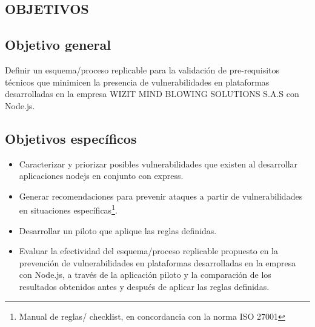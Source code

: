 \begin{center}
    \item  \section{OBJETIVOS}
\end{center}

\subsection{Objetivo general}

Definir un esquema/proceso replicable para la validación de pre-requisitos técnicos que minimicen la presencia de vulnerabilidades en plataformas desarrolladas en la empresa WIZIT MIND BLOWING SOLUTIONS S.A.S con Node.js.

\subsection{Objetivos específicos}
\begin{itemize}
    \item Caracterizar y priorizar posibles vulnerabilidades que existen al desarrollar aplicaciones nodejs en conjunto con express.
    \item Generar recomendaciones para prevenir ataques a partir de vulnerabilidades en situaciones específicas\footnote{Manual de reglas/ checklist, en concordancia con la norma ISO 27001}.
    \item Desarrollar un piloto que aplique las reglas definidas.
    \item Evaluar la efectividad del esquema/proceso replicable propuesto en la prevención de vulnerabilidades en plataformas desarrolladas en la empresa con Node.js, a través de la aplicación piloto y la comparación de los resultados obtenidos antes y después de aplicar las reglas definidas.
\end{itemize}



